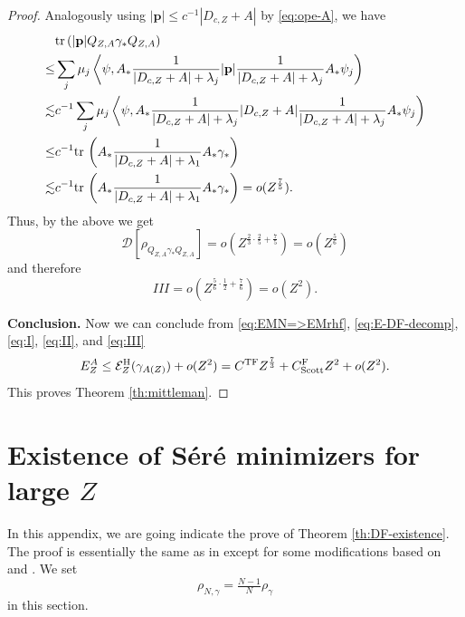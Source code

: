 \documentclass[a4paper]{amsart}
\def\tr{{\rm tr \,}}
\def\bp{{\mathbf p}}
\def\cD{\mathcal{D}}
\def\cE{{\mathcal E}}
\begin{document}
\begin{proof}
Analogously using $|\bp|\leq c^{-1}|D_{c,Z}+A|$ by
\eqref{eq:ope-A}, we have
\begin{equation}
  \begin{split}
  &\tr(|\bp| Q_{Z,A}\gamma_* Q_{Z,A})\\
    \leq &\sum_{j} \mu_j \left\langle\psi,A_*\frac{1}{|D_{c,Z}+A|+\lambda_j}
      |\bp|\frac{1}{|D_{c,Z}+A|+\lambda_j} A_* \psi_j\right)\\
    \lesssim &c^{-1}\sum_{j} \mu_j \left\langle\psi,A_*\frac{1}{|D_{c,Z}+A|+\lambda_j}
      |D_{c,Z}+A|\frac{1}{|D_{c,Z}+A|+\lambda_j} A_* \psi_j\right)\\
    \leq&
    c^{-1}\tr\left(A_*{1\over|D_{c,Z}+A|+\lambda_1}A_*\gamma_*\right)\\
    \lesssim& c^{-1}\tr\left(A_*{1\over|D_{c,Z}+A|+\lambda_1}A_*\gamma_*\right)
     =o(Z^{\frac75}).
  \end{split}
\end{equation}
Thus, by the above we get
\begin{equation}
  \cD[\rho_{Q_{Z,A}\gamma_* Q_{Z,A}}] = o(Z^{\frac23\cdot\frac25+\frac75})=o(Z^\frac56)
\end{equation}
and therefore
\begin{equation}\label{eq:III}
    III = o(Z^{\frac56\cdot\frac12+\frac76})=o(Z^2).
\end{equation}

{\bf Conclusion.} Now we can conclude from \eqref{eq:EMN=>EMrhf},
\eqref{eq:E-DF-decomp}, \eqref{eq:I}, \eqref{eq:II}, and
\eqref{eq:III}
\begin{equation}
  E_{Z}^{A}\leq \cE^{\rm H}_{Z}(\gamma_{A(Z)})+o(Z^2)
  =C^\mathrm{TF}Z^{\frac73}+C_\mathrm{Scott}^{\rm F}Z^2+o(Z^2).
\end{equation}
This proves Theorem \ref{th:mittleman}.
\end{proof}

\appendix
\section{Existence of S\'er\'e minimizers for large $Z$}
\label{sec:existence}

In this appendix, we are going indicate the prove of Theorem
\ref{th:DF-existence}. The proof is essentially the same as in
\cite{Sere2023} except for some modifications based on
\cite{Fournaisetal2020} and \cite{Meng2023}. We set 
\begin{equation}
    \rho_{N,\gamma}=\tfrac{N-1}{N}\rho_{\gamma}
\end{equation}
in this section.
\end{document}
